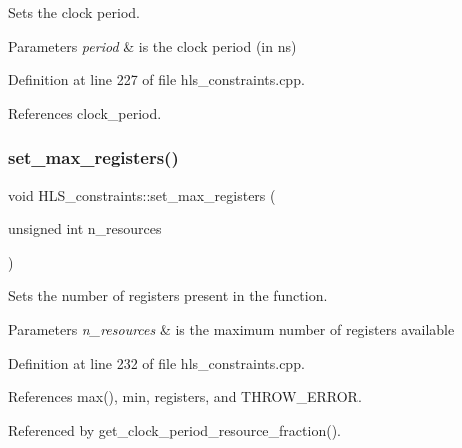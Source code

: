 Sets the clock period. 


\begin{DoxyParams}{Parameters}
{\em period} & is the clock period (in ns) \\
\hline
\end{DoxyParams}


Definition at line 227 of file hls\+\_\+constraints.\+cpp.



References clock\+\_\+period.

\mbox{\label{classHLS__constraints_ab2df34ff3335a38b047895ca9d303583}} 
\subsubsection{\texorpdfstring{set\+\_\+max\+\_\+registers()}{set\_max\_registers()}}
{\footnotesize\ttfamily void H\+L\+S\+\_\+constraints\+::set\+\_\+max\+\_\+registers (\begin{DoxyParamCaption}\item[{unsigned int}]{n\+\_\+resources }\end{DoxyParamCaption})}



Sets the number of registers present in the function. 


\begin{DoxyParams}{Parameters}
{\em n\+\_\+resources} & is the maximum number of registers available \\
\hline
\end{DoxyParams}


Definition at line 232 of file hls\+\_\+constraints.\+cpp.



References max(), min, registers, and T\+H\+R\+O\+W\+\_\+\+E\+R\+R\+OR.



Referenced by get\+\_\+clock\+\_\+period\+\_\+resource\+\_\+fraction().

